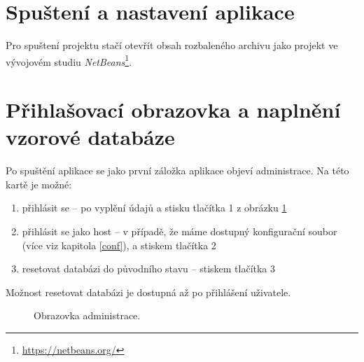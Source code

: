 \documentclass[11pt,a4paper]{article}
\begin{document}
 \sloppy
\titlepageandcontents

\section{Spuštení a nastavení aplikace}
Pro spuštení projektu stačí otevřít obsah rozbaleného archivu jako projekt ve vývojovém studiu \emph{NetBeans}\footnote{\url{https://netbeans.org/}}.

\section{Přihlašovací obrazovka a naplnění vzorové databáze}\label{sec1}
Po spuštění aplikace se jako první záložka aplikace objeví administrace. Na této kartě je možné:
\begin{enumerate}
 \item přihlásit se -- po vyplění údajů a stisku tlačítka 1 z obrázku \ref{admin}
 \item přihlásit se jako host -- v případě, že máme dostupný konfigurační soubor (více viz kapitola \ref{conf}), a stiskem tlačítka 2
 \item resetovat databázi do původního stavu -- stiskem tlačítka 3
 \end{enumerate}
 Možnost resetovat databázi je dostupná až po přihlášení uživatele.

\begin{figure}[h!]
\begin{center}
\caption{Obrazovka administrace.}
\label{admin}
\end{center}
\end{figure}
\end{document}
